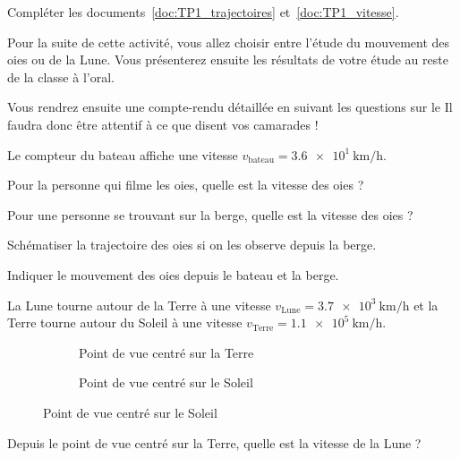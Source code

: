 
\numeroQuestion
Compléter les documents~\ref{doc:TP1_trajectoires} et~\ref{doc:TP1_vitesse}.

\fleche Pour la suite de cette activité, vous allez choisir entre l'étude du mouvement des oies ou de la Lune.
Vous présenterez ensuite les résultats de votre étude au reste de la classe à l'oral.

\fleche Vous rendrez ensuite une compte-rendu détaillée en suivant les questions sur le 
Il faudra donc être attentif à ce que disent vos camarades !


\newpage
{}

Le compteur du bateau affiche une vitesse $v_\text{bateau} = \qty{3,6e1}{\km/\hour}$.

\vspace*{6pt}
\numeroQuestion Pour la personne qui filme les oies, quelle est la vitesse des oies ?

\numeroQuestion Pour une personne se trouvant sur la berge, quelle est la vitesse des oies ?

\numeroQuestion Schématiser la trajectoire des oies si on les observe depuis la berge.

\numeroQuestion Indiquer le mouvement des oies depuis le bateau et la berge.


La Lune tourne autour de la Terre à une vitesse $v_\text{Lune} = \qty{3,7e3}{\km/\hour}$
et la Terre tourne autour du Soleil à une vitesse $v_\text{Terre} = \qty{1,1e5}{\km/\hour}$.

\begin{figure}[!ht]
  \begin{subfigure}{0.48\linewidth}
    \centering
    \caption{Point de vue centré sur la Terre}
    \label{fig:terre_lune}
  \end{subfigure}
  \begin{subfigure}{0.48\linewidth}
    \centering
    \caption{Point de vue centré sur le Soleil}
    \label{fig:terre_lune_soleil}
  \end{subfigure}
\end{figure}

\vspace*{-6pt}
\numeroQuestion Depuis le point de vue centré sur la Terre, quelle est la vitesse de la Lune ?

